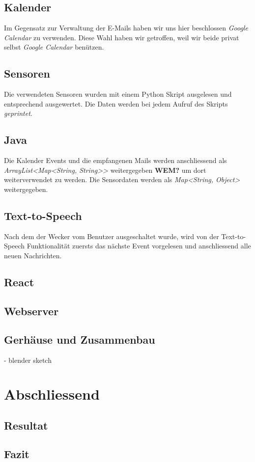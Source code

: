 \documentclass[11pt,a4paper]{article}
\begin{document}
\subsection{Kalender}
Im Gegensatz zur Verwaltung der E-Mails haben wir uns hier beschlossen \textit{Google Calendar} zu verwenden. Diese Wahl haben wir getroffen, weil wir beide privat selbst \textit{Google Calendar} ben\"utzen.

\subsection{Sensoren}
Die verwendeten Sensoren wurden mit einem Python Skript ausgelesen und entsprechend ausgewertet. Die Daten werden bei jedem Aufruf des Skripts \textit{geprintet}.

\subsection{Java}
Die Kalender Events und die empfangenen Mails werden anschliessend als \textit{ArrayList<Map<String, String>>} weitergegeben \textbf{WEM?} um dort weiterverwendet zu werden. Die Sensordaten werden als \textit{Map<String, Object>} weitergegeben.

\subsection{Text-to-Speech}
Nach dem der Wecker vom Benutzer ausgeschaltet wurde, wird von der Text-to-Speech Funktionalit\"at zuersts das n\"achste Event vorgelesen und anschliessend alle neuen Nachrichten.
\subsection{React}

\subsection{Webserver}

\subsection{Gerhäuse und Zusammenbau}
- blender sketch

\section{Abschliessend}
\subsection{Resultat}
\subsection{Fazit}



\end{document}
